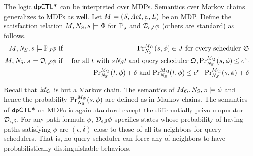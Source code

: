 The logic $\dpCTLstar$ can be interpreted over MDPs. Semantics over Markov chains generalizes to MDPs as well. %
Let $M = (S, \Act, \wp, L)$ be an MDP. Define the satisfaction
relation $M, \neighbor{S}, s \models \Phi$ for $\PJ{J}$ and $\dpriv{\epsilon}{\delta} \phi$ (others are standard) as follows.
\begin{eqnarray*}
  M, \neighbor{S}, s \models \PJ{J} \phi
  & \textmd{ if } &
  \myPr{s}{M_{\scheduler{S}}}{\neighbor{S}}{\phi} \in J
  \textmd{ for every scheduler } \scheduler{S}\\
  M, \neighbor{S}, s \models \dpriv{\epsilon}{\delta} \phi
  & \textmd{ if } &
  \textmd{for all } t \textmd{ with } s \neighbor{S} t \textmd{ and
   query scheduler } \scheduler{Q},
   \myPr{s}{M_{\scheduler{Q}}}{\neighbor{S}}{\phi} \leq
  e^{\epsilon} \cdot
   \\
  & &
   \myPr{t}{M_{\scheduler{Q}}}{\neighbor{S}}{\phi} + \delta
   \textmd{ and }
   \myPr{t}{M_{\scheduler{Q}}}{\neighbor{S}}{\phi} \leq e^{\epsilon} \cdot
   \myPr{s}{M_{\scheduler{Q}}}{\neighbor{S}}{\phi} + \delta
\end{eqnarray*}

Recall that $M_{\scheduler{S}}$ is but a Markov chain. The semantics
of $M_{\scheduler{S}}, \neighbor{S}, \pi \models \phi$ and hence the
probability $\myPr{s}{M_{\scheduler{S}}}{\neighbor{S}}{\phi}$ are
defined as in Markov chains.
The semantics of $\dpCTLstar$ on MDPs
is again standard except the differentially private operator
$\dpriv{\epsilon}{\delta}$. For any path formula $\phi$,
$\dpriv{\epsilon}{\delta} \phi$ specifies states whose probability
of having paths satisfying $\phi$ are $(\epsilon, \delta)$-close to
those of all its neighbors for query schedulers. That is, no
query scheduler can force any of neighbors to have
probabilistically distinguishable behaviors.

\noindent
